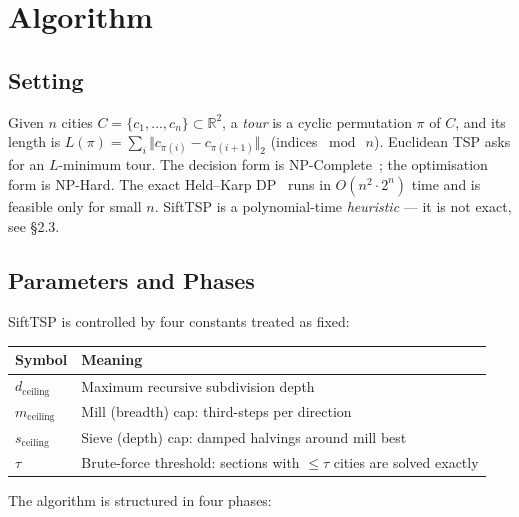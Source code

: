 \documentclass[11pt,a4paper]{article}
\begin{document}
\section{Algorithm}

\subsection{Setting}

Given $n$ cities $C = \{c_1, \dots, c_n\} \subset \mathbb{R}^2$, a
\emph{tour} is a cyclic permutation $\pi$ of $C$, and its length is
$L(\pi) = \sum_i \Vert c_{\pi(i)} - c_{\pi(i+1)} \Vert_2$ (indices
$\bmod\ n$). Euclidean TSP asks for an $L$-minimum tour. The decision
form is NP-Complete~\cite{karp1972}; the optimisation form is NP-Hard. The exact
Held--Karp DP~\cite{heldkarp1962} runs in $O(n^2 \cdot 2^n)$ time and is feasible only
for small $n$. SiftTSP is a polynomial-time \emph{heuristic} --- it is
not exact, see \S2.3.

\subsection{Parameters and Phases}

SiftTSP is controlled by four constants treated as fixed:

\begin{center}
\begin{tabular}{ll}
\toprule
Symbol & Meaning \\
\midrule
$d_{\text{ceiling}}$ & Maximum recursive subdivision depth \\
$m_{\text{ceiling}}$ & Mill (breadth) cap: third-steps per direction \\
$s_{\text{ceiling}}$ & Sieve (depth) cap: damped halvings around mill best \\
$\tau$ & Brute-force threshold: sections with $\leq \tau$ cities are solved exactly \\
\bottomrule
\end{tabular}
\end{center}

The algorithm is structured in four phases:
\end{document}
